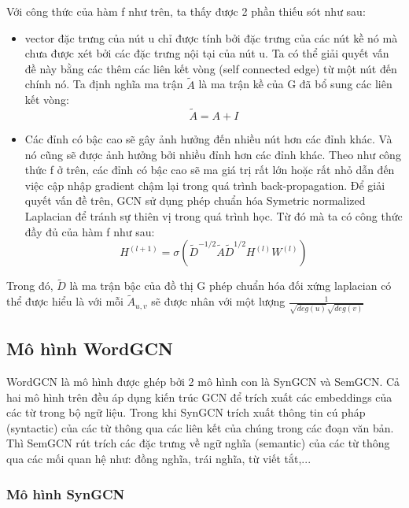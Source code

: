 Với công thức của hàm f như trên, ta thấy được 2 phần thiếu sót như sau:
\begin{itemize}
	\item vector đặc trưng của nút u chỉ được tính bởi đặc trưng của các nút kề nó mà chưa được xét bởi các đặc trưng nội tại của nút u. Ta có thể giải quyết vấn đề này bằng các thêm các liên kết vòng (self connected edge) từ một nút đến chính nó. Ta định nghĩa ma trận $\tilde{A}$ là ma trận kề của G đã bổ sung các liên kết vòng:
	\begin{equation*}
		\tilde{A} = A + I
	\end{equation*} 
	\item Các đỉnh có bậc cao sẽ gây ảnh hưởng đến nhiều nút hơn các đỉnh khác. Và nó cũng sẽ được ảnh hưởng bởi nhiều đỉnh hơn các đỉnh khác. Theo như công thức f ở trên, các đỉnh có bậc cao sẽ ma giá trị rất lớn hoặc rất nhỏ dẫn đến việc cập nhập gradient chậm lại trong quá trình back-propagation. Để giải quyết vấn đề trên, GCN sử dụng phép chuẩn hóa Symetric normalized Laplacian để tránh sự thiên vị trong quá trình học.
	Từ đó mà ta có công thức đầy đủ của hàm f như sau:
	\begin{equation*}
		H^{(l+1)} = \sigma(\tilde{D}^{-1/2}\tilde{A}\tilde{D}^{1/2}H^{(l)}W^{(l)})
	\end{equation*}
\end{itemize}

Trong đó, $\tilde{D}$ là ma trận bậc của đồ thị G phép chuẩn hóa đối xứng laplacian có thể được hiểu là với mỗi $\tilde{A}_{u,v}$ sẽ được nhân với một lượng $\frac{1}{\sqrt{deg(u)}\sqrt{deg(v)}}$

\subsection{Mô hình WordGCN}

WordGCN là mô hình được ghép bởi 2 mô hình con là SynGCN và SemGCN. Cả hai mô hình trên đều áp dụng kiến trúc GCN để trích xuất các embeddings của các từ trong bộ ngữ liệu. Trong khi SynGCN trích xuất thông tin cú pháp (syntactic) của các từ thông qua các liên kết của chúng trong các đoạn văn bản. Thì SemGCN rút trích các đặc trưng về ngữ nghĩa (semantic) của các từ thông qua các mối quan hệ như: đồng nghĩa, trái nghĩa, từ viết tắt,...

\subsubsection{Mô hình SynGCN}

